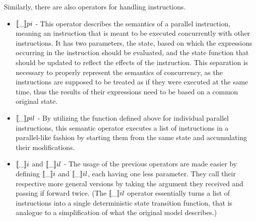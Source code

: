 Similarly, there are also operators for handling instructions.
\begin{itemize}
    \item $\llbracket \_ \rrbracket pi$ - This operator describes the semantics of a parallel instruction, meaning an instruction that is meant to be executed concurrently with other instructions. It has two parameters, the state, based on which the expressions occurring in the instruction should be evaluated, and the state function that should be updated to reflect the effects of the instruction. This separation is necessary to properly represent the semantics of concurrency, as the instructions are supposed to be treated as if they were executed at the same time, thus the results of their expressions need to be based on a common original state.
    \begin{code}
        \>[2]\AgdaSpace{}%
        \AgdaSymbol{:}\AgdaSpace{}%
        \AgdaSpace{}%
        \AgdaSpace{}%
        \AgdaSpace{}%
        \AgdaSpace{}%
        \AgdaSpace{}%
        \AgdaSpace{}%
        \<%
    \end{code}
    
    \item $\llbracket \_ \rrbracket pil$ - By utilizing the function defined above for individual parallel instructions, this semantic operator executes a list of instructions in a parallel-like fashion by starting them from the same state and accumulating their modifications.
    \begin{code}
        \>[2]\AgdaSpace{}%
        \AgdaSymbol{:}\AgdaSpace{}%
        \AgdaSpace{}%
        \AgdaSpace{}%
        \AgdaSpace{}%
        \AgdaSpace{}%
        \AgdaSpace{}%
        \AgdaSpace{}%
        \AgdaSpace{}%
        \<%
    \end{code}
    
    \item $\llbracket \_ \rrbracket i$ and $\llbracket \_ \rrbracket il$ - The usage of the previous operators are made easier by defining $\llbracket \_ \rrbracket i$ and $\llbracket \_ \rrbracket il$, each having one less parameter. They call their respective more general versions by taking the argument they received and passing if forward twice.
    (The $\llbracket \_ \rrbracket il$ operator essentially turns a list of instructions into a single deterministic state transition function, that is analogue to a simplification of what the original model describes.)
    

\end{itemize}
